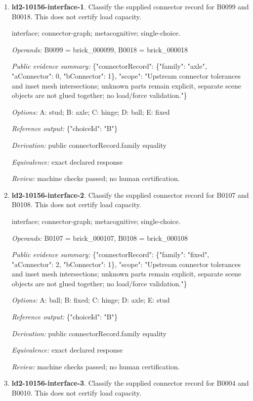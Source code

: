 \begin{enumerate}
\item \textbf{ld2-10156-interface-1}. Classify the supplied connector record for B0099 and B0018. This does not certify load capacity.
\par{\small interface; connector-graph; metacognitive; single-choice.\par\textit{Operands:} B0099 = brick\_000099, B0018 = brick\_000018\par\textit{Public evidence summary:} \{"connectorRecord": \{"family": "axle", "aConnector": 0, "bConnector": 1\}, "scope": "Upstream connector tolerances and inset mesh intersections; unknown parts remain explicit, separate scene objects are not glued together; no load/force validation."\}\par\textit{Options:} A: stud; B: axle; C: hinge; D: ball; E: fixed\par\textit{Reference output:} \{"choiceId": "B"\}\par\textit{Derivation:} public connectorRecord.family equality\par\textit{Equivalence:} exact declared response\par\textit{Review:} machine checks passed; no human certification.}
\item \textbf{ld2-10156-interface-2}. Classify the supplied connector record for B0107 and B0108. This does not certify load capacity.
\par{\small interface; connector-graph; metacognitive; single-choice.\par\textit{Operands:} B0107 = brick\_000107, B0108 = brick\_000108\par\textit{Public evidence summary:} \{"connectorRecord": \{"family": "fixed", "aConnector": 2, "bConnector": 1\}, "scope": "Upstream connector tolerances and inset mesh intersections; unknown parts remain explicit, separate scene objects are not glued together; no load/force validation."\}\par\textit{Options:} A: ball; B: fixed; C: hinge; D: axle; E: stud\par\textit{Reference output:} \{"choiceId": "B"\}\par\textit{Derivation:} public connectorRecord.family equality\par\textit{Equivalence:} exact declared response\par\textit{Review:} machine checks passed; no human certification.}
\item \textbf{ld2-10156-interface-3}. Classify the supplied connector record for B0004 and B0010. This does not certify load capacity.

\end{enumerate}
